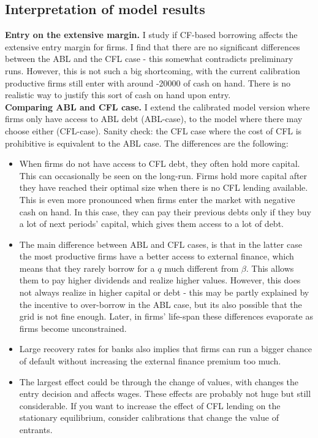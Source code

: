 \documentclass[12pt]{article}
\begin{document}
\subsection*{Interpretation of model results}
\textbf{Entry on the extensive margin.} I study if CF-based borrowing affects the extensive entry margin for firms. I find that there are no significant differences between the ABL and the CFL case - this somewhat contradicts preliminary runs. However, this is not such a big shortcoming, with the current calibration productive firms still enter with around -20000 of cash on hand. There is no realistic way to justify this sort of cash on hand upon entry. \vspace{3mm} \\
\textbf{Comparing ABL and CFL case.} I extend the calibrated model version where firms only have access to ABL debt (ABL-case), to the model where there may choose either (CFL-case). Sanity check: the CFL case where the cost of CFL is prohibitive is equivalent to the ABL case. The differences are the following: 
\begin{itemize}\setlength\itemsep{0em} \small
    \item When firms do not have access to CFL debt, they often hold more capital. This can occasionally be seen on the long-run. Firms hold more capital after they have reached their optimal size when there is no CFL lending available. This is even more pronounced when firms enter the market with negative cash on hand. In this case, they can pay their previous debts only if they buy a lot of next periods' capital, which gives them access to a lot of debt.
    \item The main difference between ABL and CFL cases, is that in the latter case the most productive firms have a better access to external finance, which means that they rarely borrow for a $q$ much different from $\beta$. This allows them to pay higher dividends and realize higher values. However, this does not always realize in higher capital or debt - this may be partly explained by the incentive to over-borrow in the ABL case, but its also possible that the grid is not fine enough. Later, in firms' life-span these differences evaporate as firms become unconstrained.
    \item Large recovery rates for banks also implies that firms can run a bigger chance of default without increasing the external finance premium too much.
    \item The largest effect could be through the change of values, with changes the entry decision and affects wages. These effects are probably not huge but still considerable. If you want to increase the effect of CFL lending on the stationary equilibrium, consider calibrations that change the value of entrants.
\end{itemize} \normalsize
\end{document}
